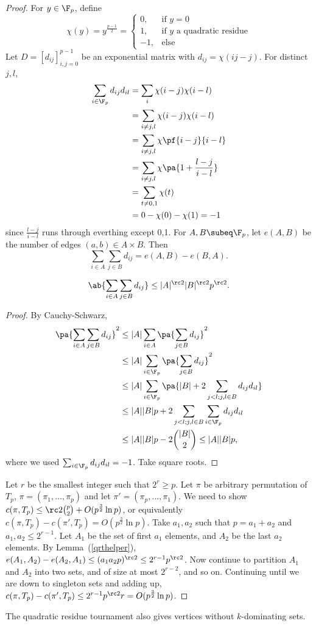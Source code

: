 \begin{proof}
For $y\in \F_p$, define 
\[
\chi(y)=y^{\frac{p-1}{2}}=\begin{cases}
0,&\text{if }y=0\\
1,&\text{if }y\text{ a quadratic residue}\\
-1,&\text{else}
\end{cases}
\]
Let $D=[d_{ij}]_{i,j=0}^{p-1}$ be an exponential matrix with $d_{ij}=\chi(ij-j)$. For distinct $j,l$, 
\begin{align*}
\sum_{i\in \F_p} d_{ij}d_{il}&=\sum_i\chi(i-j)\chi(i-l)\\
&=\sum_{i\ne j,l} \chi(i-j) \chi(i-l)\\
&=\sum_{i\ne j,l} \chi\pf{i-j}{i-l}\\
&=\sum_{i\ne j,l} \chi\pa{1+\frac{l-j}{i-l}}\\
&=\sum_{t\ne 0,1}\chi(t)\\
&=0-\chi(0)-\chi(1)=-1
\end{align*}
since $\frac{l-j}{i-l}$ runs through everthing except 0,1. For $A,B\subeq \F_p$, let $e(A,B)$ be the number of edges $(a,b)\in A\times B$. Then
\[
\sum_{i\in A}\sum_{j\in B} d_{ij} =e(A, B)-e(B,A).
\]
\begin{lem}\label{qrthelper}
\[\ab{\sum_{i\in A}\sum_{j\in B} d_{ij} }\le |A|^{\rc 2}|B|^{\rc 2}p^{\rc 2}.\]
\end{lem}
\begin{proof}
By Cauchy-Schwarz,
\begin{align*}
\pa{\sum_{i\in A} \sum_{j\in B} d_{ij}}^2
&\le
|A|\sum_{i\in A} \pa{\sum_{j\in B} d_{ij}}^2\\
&\le
|A|\sum_{i\in \F_p}\pa{\sum_{j\in B} d_{ij}}^2\\
&\le
|A|\sum_{i\in \F_p} \pa{|B|+2\sum_{j<l; j,l\in B} d_{ij}d_{il}}\\
&\le |A||B|p+2\sum_{j<l; j,l\in B} \sum_{i\in \F_p}d_{ij}d_{il}\\
&\le |A||B|p-2\binom{|B|}{2}\le |A||B|p,
\end{align*}
where we used $\sum_{i\in \F_p} d_{ij}d_{il}=-1$. Take square roots.
\end{proof}
Let $r$ be the smallest integer such that $2^r\ge p$. Let $\pi$ be arbitrary permutation of $T_p$, $\pi=(\pi_1,\ldots, \pi_p)$ and let $\pi'=(\pi_p,\ldots, \pi_1)$. We need to show $c(\pi, T_p)\le \rc 2\binom p2+O(p^{\frac 32}\ln p)$, or equivalently $c(\pi, T_p)-c(\pi',T_p)=O(p^{\frac 32}\ln p)$. Take $a_1,a_2$ such that $p=a_1+a_2$ and $a_1,a_2\le 2^{r-1}$. Let $A_1$ be the set of first $a_1$ elements, and $A_2$ be the last $a_2$ elements. 
By Lemma~(\ref{qrthelper}), $e(A_1,A_2)-e(A_2,A_1)\le (a_1a_2p)^{\rc 2} \le 2^{r-1}p^{\rc 2}$. Now continue to partition $A_1$ and $A_2$ into two sets, and of size at most $2^{r-2}$, and so on. Continuing until we are down to singleton sets and adding up, $c(\pi, T_p)-c(\pi', T_p)\le 2^{r-1} p^{\rc 2} r=O(p^{\frac 32}\ln p)$.
\end{proof}
The quadratic residue tournament also gives vertices without $k$-dominating sets.

